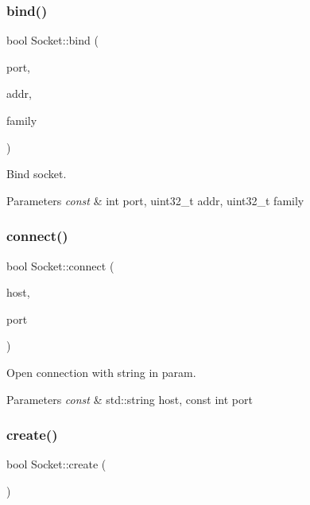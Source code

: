 \subsubsection{\texorpdfstring{bind()}{bind()}}
{\footnotesize\ttfamily bool Socket\+::bind (\begin{DoxyParamCaption}\item[{const int}]{port,  }\item[{uint32\+\_\+t}]{addr,  }\item[{uint32\+\_\+t}]{family }\end{DoxyParamCaption})}



Bind socket. 


\begin{DoxyParams}{Parameters}
{\em const} & int port, uint32\+\_\+t addr, uint32\+\_\+t family \\
\hline
\end{DoxyParams}
\mbox{\label{class_socket_a33302b899ea60cce8ed98ba5a187c3f0}} 
\subsubsection{\texorpdfstring{connect()}{connect()}}
{\footnotesize\ttfamily bool Socket\+::connect (\begin{DoxyParamCaption}\item[{const std\+::string}]{host,  }\item[{const int}]{port }\end{DoxyParamCaption})}



Open connection with string in param. 


\begin{DoxyParams}{Parameters}
{\em const} & std\+::string host, const int port \\
\hline
\end{DoxyParams}
\mbox{\label{class_socket_a6afde2dca985dacdfa770141192e2daf}} 
\subsubsection{\texorpdfstring{create()}{create()}}
{\footnotesize\ttfamily bool Socket\+::create (\begin{DoxyParamCaption}{ }\end{DoxyParamCaption})}



